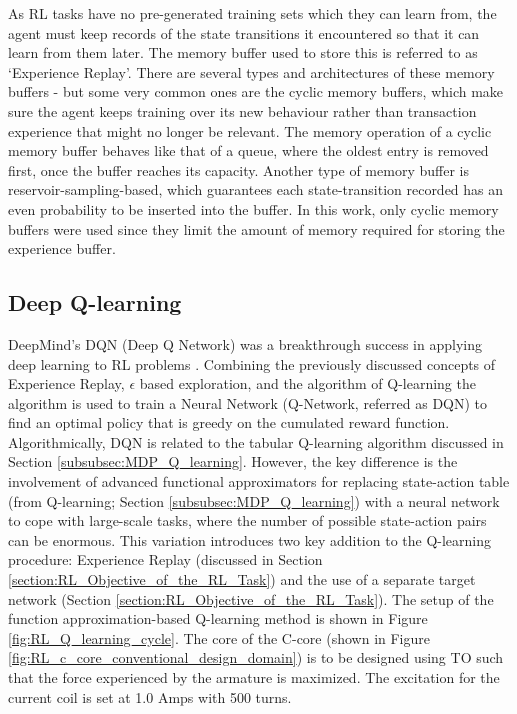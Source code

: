 As RL tasks have no pre-generated training sets which they can learn from, the agent must keep records of the state transitions it encountered so that it can learn from them later. The memory buffer used to store this is referred to as `Experience Replay'. There are several types and architectures of these memory buffers - but some very common ones are the cyclic memory buffers, which make sure the agent keeps training over its new behaviour rather than transaction experience that might no longer be relevant. The memory operation of a cyclic memory buffer behaves like that of a queue, where the oldest entry is removed first, once the buffer reaches its capacity. Another type of memory buffer is reservoir-sampling-based, which guarantees each state-transition recorded has an even probability to be inserted into the buffer. In this work, only cyclic memory buffers were used since they limit the amount of memory required for storing the experience buffer.

\subsection{Deep Q-learning}

DeepMind's DQN (Deep Q Network) was a breakthrough success in applying deep learning to RL problems \parencite{mnih2013playing}. Combining the previously discussed concepts of Experience Replay, $\epsilon$ based exploration, and the algorithm of Q-learning the algorithm is used to train a Neural Network (Q-Network, referred as DQN) to find an optimal policy that is greedy on the cumulated reward function. Algorithmically, DQN is related to the tabular Q-learning algorithm discussed in Section \ref{subsubsec:MDP_Q_learning}. However, the key difference is the involvement of advanced functional approximators for replacing state-action table (from Q-learning; Section \ref{subsubsec:MDP_Q_learning}) with a neural network to cope with large-scale tasks, where the number of possible state-action pairs can be enormous. This variation introduces two key addition to the Q-learning procedure: Experience Replay (discussed in Section \ref{section:RL_Objective_of_the_RL_Task}) and the use of a separate target network (Section \ref{section:RL_Objective_of_the_RL_Task}). The setup of the function approximation-based Q-learning method is shown in Figure \ref{fig:RL_Q_learning_cycle}. The core of the C-core (shown in Figure \ref{fig:RL_c_core_conventional_design_domain}) is to be designed using TO such that the force experienced by the armature is maximized. The excitation for the current coil is set at 1.0 Amps with 500 turns.

